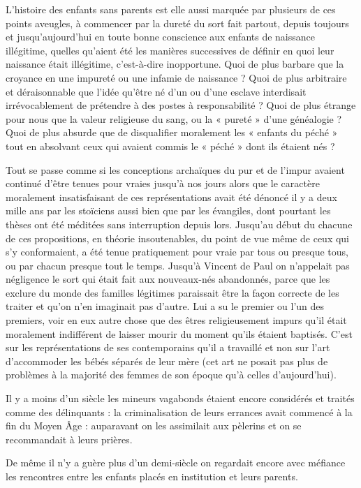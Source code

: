  L'histoire des enfants sans parents est elle aussi marquée par plusieurs de ces points aveugles, à commencer par la dureté du sort fait partout, depuis toujours et jusqu'aujourd'hui en toute bonne conscience aux enfants de naissance illégitime, quelles qu'aient été les manières successives de définir en quoi leur naissance était illégitime, c'est-à-dire inopportune. Quoi de plus barbare que la croyance en une impureté ou une infamie de naissance ? Quoi de plus arbitraire et déraisonnable que l'idée qu'être né d'un ou d'une esclave interdisait irrévocablement de prétendre à des postes à responsabilité ? Quoi de plus étrange pour nous que la valeur religieuse du sang, ou la « pureté » d'une généalogie ? Quoi de plus absurde que de disqualifier moralement les « enfants du péché » tout en absolvant ceux qui avaient commis le « péché » dont ils étaient nés ? 

 Tout se passe comme si les conceptions archaïques du pur et de l'impur avaient continué d'être tenues pour vraies jusqu'à nos jours alors que le caractère moralement insatisfaisant de ces représentations avait été dénoncé il y a deux mille ans par les stoïciens aussi bien que par les évangiles, dont pourtant les thèses ont été méditées sans interruption depuis lors. Jusqu'au début du  chacune de ces propositions, en théorie insoutenables, du point de vue même de ceux qui s'y conformaient, a été tenue pratiquement pour vraie par tous ou presque tous, ou par chacun presque tout le temps. Jusqu'à Vincent de Paul on n'appelait pas négligence le sort qui était fait aux nouveaux-nés abandonnés, parce que les exclure du monde des familles légitimes paraissait être la façon correcte de les traiter et qu'on n'en imaginait pas d'autre. Lui a su le premier ou l'un des premiers, voir en eux autre chose que des êtres religieusement impurs qu'il était moralement indifférent de laisser mourir du moment qu'ils étaient baptisés. C'est sur les représentations de ses contemporains qu'il a travaillé et non sur l'art d'accommoder les bébés séparés de leur mère (cet art ne posait pas plus de problèmes à la majorité des femmes de son époque qu'à celles d'aujourd'hui). 

 Il y a moins d'un siècle les mineurs vagabonds étaient encore considérés et traités comme des délinquants : la criminalisation de leurs errances avait commencé à la fin du Moyen Âge : auparavant on les assimilait aux pèlerins et on se recommandait à leurs prières. 

 De même il n'y a guère plus d'un demi-siècle on regardait encore avec méfiance les rencontres entre les enfants placés en institution et leurs parents. 

